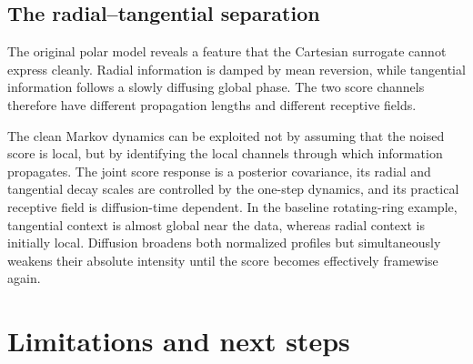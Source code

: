 \documentclass[11pt,a4paper]{article}
\begin{document}
\subsection{The radial--tangential separation}

The original polar model reveals a feature that the Cartesian surrogate cannot express cleanly. Radial information is damped by mean reversion, while tangential information follows a slowly diffusing global phase. The two score channels therefore have different propagation lengths and different receptive fields.

\begin{keyresult}
The clean Markov dynamics can be exploited not by assuming that the noised score is local, but by identifying the local channels through which information propagates. The joint score response is a posterior covariance, its radial and tangential decay scales are controlled by the one-step dynamics, and its practical receptive field is diffusion-time dependent. In the baseline rotating-ring example, tangential context is almost global near the data, whereas radial context is initially local. Diffusion broadens both normalized profiles but simultaneously weakens their absolute intensity until the score becomes effectively framewise again.
\end{keyresult}

\section{Limitations and next steps}
\end{document}
